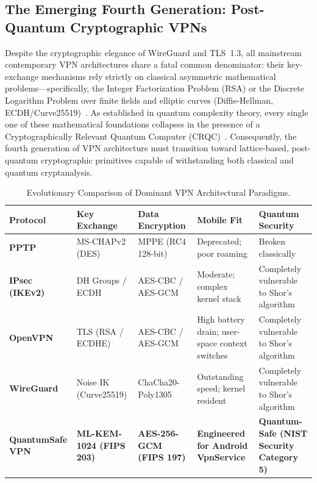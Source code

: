 \subsection{The Emerging Fourth Generation: Post-Quantum Cryptographic VPNs}
Despite the cryptographic elegance of WireGuard and TLS~1.3, all mainstream contemporary VPN architectures share a fatal common denominator: their key-exchange mechanisms rely strictly on classical asymmetric mathematical problems---specifically, the Integer Factorization Problem (RSA) or the Discrete Logarithm Problem over finite fields and elliptic curves (Diffie-Hellman, ECDH/Curve25519)~\cite{diffie1976new,rivest1978method,koblitz1987elliptic}. As established in quantum complexity theory, every single one of these mathematical foundations collapses in the presence of a Cryptographically Relevant Quantum Computer (CRQC)~\cite{shor1994algorithms}. Consequently, the fourth generation of VPN architecture must transition toward lattice-based, post-quantum cryptographic primitives capable of withstanding both classical and quantum cryptanalysis.

\begin{table}[htbp]
  \centering
  \small
  \caption{Evolutionary Comparison of Dominant VPN Architectural Paradigms.}
  \label{tab:vpn_evolution_comparison}
  \begin{tabular}{@{}P{2.4cm}P{2.6cm}P{2.8cm}P{2.8cm}P{3.2cm}@{}}
    \toprule
    \textbf{Protocol} & \textbf{Key Exchange} & \textbf{Data Encryption} & \textbf{Mobile Fit} & \textbf{Quantum Security} \\
    \midrule
    \textbf{PPTP} & MS-CHAPv2 (DES) & MPPE (RC4 128-bit) & Deprecated; poor roaming & Broken classically \\
    \textbf{IPsec (IKEv2)} & DH Groups / ECDH & AES-CBC / AES-GCM & Moderate; complex kernel stack & Completely vulnerable to Shor's algorithm \\
    \textbf{OpenVPN} & TLS (RSA / ECDHE) & AES-CBC / AES-GCM & High battery drain; user-space context switches & Completely vulnerable to Shor's algorithm \\
    \textbf{WireGuard} & Noise IK (Curve25519) & ChaCha20-Poly1305 & Outstanding speed; kernel resident & Completely vulnerable to Shor's algorithm \\
    \textbf{QuantumSafe VPN} & \textbf{ML-KEM-1024 (FIPS 203)} & \textbf{AES-256-GCM (FIPS 197)} & \textbf{Engineered for Android VpnService} & \textbf{Quantum-Safe (NIST Security Category 5)} \\
    \bottomrule
  \end{tabular}
\end{table}

